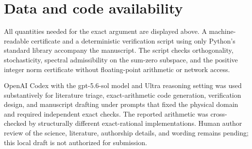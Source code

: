 \documentclass[aps,pra,reprint,superscriptaddress,nofootinbib,longbibliography]{revtex4-2}
\begin{document}
\section*{Data and code availability}

All quantities needed for the exact argument are displayed above.  A
machine-readable certificate and a deterministic verification script using
only Python's standard library accompany the manuscript.  The script checks
orthogonality, stochasticity, spectral admissibility on the sum-zero
subspace, and the positive integer norm certificate without floating-point
arithmetic or network access.

\begin{acknowledgments}
OpenAI Codex with the gpt-5.6-sol model and Ultra reasoning setting was used
substantively for literature triage, exact-arithmetic code generation,
verification design, and manuscript drafting under prompts that fixed the
physical domain and required independent exact checks.  The reported
arithmetic was cross-checked by structurally different exact-rational
implementations.  Human author review of the science, literature, authorship
details, and wording remains pending; this local draft is not authorized for
submission.
\end{acknowledgments}


\end{document}
